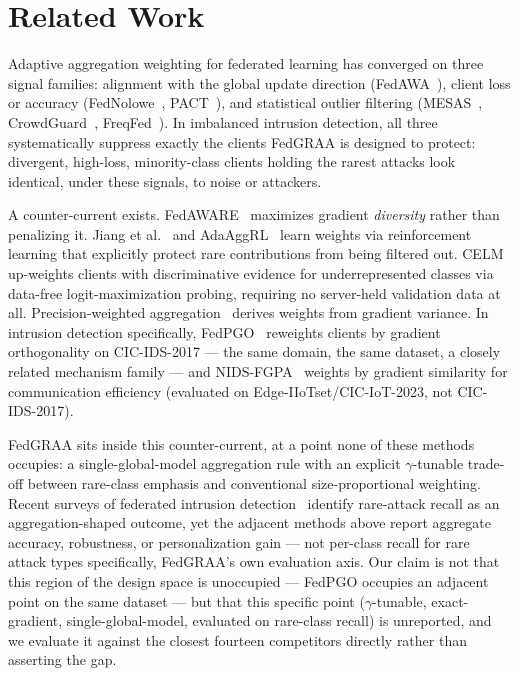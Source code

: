 \documentclass{llncs}
\begin{document}
\section{Related Work}

Adaptive aggregation weighting for federated learning has converged on three signal families: alignment with the global update direction (FedAWA~\cite{FedAWA}), client loss or accuracy (FedNolowe~\cite{FedNolowe}, PACT~\cite{PACT}), and statistical outlier filtering (MESAS~\cite{MESAS}, CrowdGuard~\cite{CrowdGuard}, FreqFed~\cite{FreqFed}). In imbalanced intrusion detection, all three systematically suppress exactly the clients FedGRAA is designed to protect: divergent, high-loss, minority-class clients holding the rarest attacks look identical, under these signals, to noise or attackers.

A counter-current exists. FedAWARE~\cite{FedAWARE} maximizes gradient \emph{diversity} rather than penalizing it. Jiang et al.~\cite{Jiang2024} and AdaAggRL~\cite{AdaAggRL} learn weights via reinforcement learning that explicitly protect rare contributions from being filtered out. CELM~\cite{CELM} up-weights clients with discriminative evidence for underrepresented classes via data-free logit-maximization probing, requiring no server-held validation data at all. Precision-weighted aggregation~\cite{Reyes2021} derives weights from gradient variance. In intrusion detection specifically, FedPGO~\cite{FedPGO} reweights clients by gradient orthogonality on CIC-IDS-2017 --- the same domain, the same dataset, a closely related mechanism family --- and NIDS-FGPA~\cite{NIDSFGPA} weights by gradient similarity for communication efficiency (evaluated on Edge-IIoTset/CIC-IoT-2023, not CIC-IDS-2017).

FedGRAA sits inside this counter-current, at a point none of these methods occupies: a single-global-model aggregation rule with an explicit $\gamma$-tunable trade-off between rare-class emphasis and conventional size-proportional weighting. Recent surveys of federated intrusion detection~\cite{MaYang2026} identify rare-attack recall as an aggregation-shaped outcome, yet the adjacent methods above report aggregate accuracy, robustness, or personalization gain --- not per-class recall for rare attack types specifically, FedGRAA's own evaluation axis. Our claim is not that this region of the design space is unoccupied --- FedPGO occupies an adjacent point on the same dataset --- but that this specific point ($\gamma$-tunable, exact-gradient, single-global-model, evaluated on rare-class recall) is unreported, and we evaluate it against the closest fourteen competitors directly rather than asserting the gap.
\end{document}
